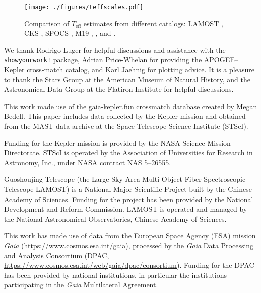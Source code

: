 \documentclass[linenumbers,tighten,trackchanges,twocolumn]{aastex631}
\newcommand{\teff}{\ensuremath{T_{\mathrm{eff}}}\xspace}
\begin{document}
\begin{figure}
    \centering
    \texttt{[image: ./figures/teffscales.pdf]}
    \caption{Comparison of \teff estimates from different catalogs: LAMOST \citep{Xiang2019}, CKS \citep{Fulton2018}, SPOCS \citep{Brewer2018}, M19 \citep{Martinez2019}, \citet{McQuillan2014}, and \citet{Hall2021}.}
    \label{fig:teffscales}
\end{figure}


\begin{acknowledgments}
We thank Rodrigo Luger for helpful discussions and assistance with the \texttt{showyourwork!} package, Adrian Price-Whelan for providing the APOGEE--Kepler cross-match catalog, and Karl Jaehnig for plotting advice. It is a pleasure to thank the Stars Group at the American Museum of Natural History, and the Astronomical Data Group at the Flatiron Institute for helpful discussions. 

This work made use of the gaia-kepler.fun crossmatch database created by Megan Bedell. This paper includes data collected by the Kepler mission and obtained from the MAST data archive at the Space Telescope Science Institute (STScI). 

Funding for the Kepler mission is provided by the NASA Science Mission Directorate. STScI is operated by the Association of Universities for Research in Astronomy, Inc., under NASA contract NAS 5–26555. 

Guoshoujing Telescope (the Large Sky Area Multi-Object Fiber Spectroscopic Telescope LAMOST) is a National Major Scientific Project built by the Chinese Academy of Sciences. Funding for the project has been provided by the National Development and Reform Commission. LAMOST is operated and managed by the National Astronomical Observatories, Chinese Academy of Sciences. 

This work has made use of data from the European Space Agency (ESA) mission {\it Gaia} (\url{https://www.cosmos.esa.int/gaia}), processed by the {\it Gaia} Data Processing and Analysis Consortium (DPAC, \url{https://www.cosmos.esa.int/web/gaia/dpac/consortium}). Funding for the DPAC has been provided by national institutions, in particular the institutions participating in the {\it Gaia} Multilateral Agreement. 


\end{acknowledgments}
\end{document}
